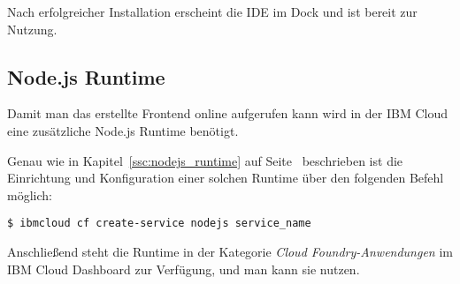 Nach erfolgreicher Installation erscheint die IDE im Dock und ist bereit zur Nutzung.

\subsection{Node.js Runtime}
Damit man das erstellte Frontend online aufgerufen kann wird in der IBM Cloud eine zusätzliche Node.js Runtime
benötigt.

Genau wie in Kapitel~\ref{ssc:nodejs_runtime} auf Seite~\pageref{ssc:nodejs_runtime} beschrieben ist die Einrichtung
und Konfiguration einer solchen Runtime über den folgenden Befehl möglich:

\begin{lstlisting}[caption=Instanziierung der Node.js Runtime, label=ls:vorbereitung_nodejsdashboard]
    $ ibmcloud cf create-service nodejs service_name
\end{lstlisting}

Anschließend steht die Runtime in der Kategorie \textit{Cloud Foundry-Anwendungen} im IBM Cloud Dashboard zur Verfügung,
und man kann sie nutzen.
